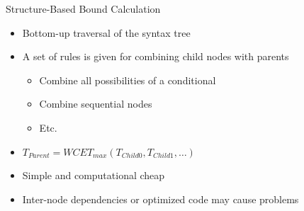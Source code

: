\documentclass{beamer}
\begin{document}
\begin{frame}{Structure-Based Bound Calculation}
  \begin{itemize}
    \item Bottom-up traversal of the syntax tree
    \item A set of rules is given for combining child nodes with parents
      \begin{itemize}
        \item Combine all possibilities of a conditional
        \item Combine sequential nodes
        \item Etc.
      \end{itemize}
    \item $T_{Parent} = WCET_{max}(T_{Child0}, T_{Child1},\dots)$
    \item Simple and computational cheap
    \item Inter-node dependencies or optimized code may cause problems
  \end{itemize}
\end{frame}
\end{document}
